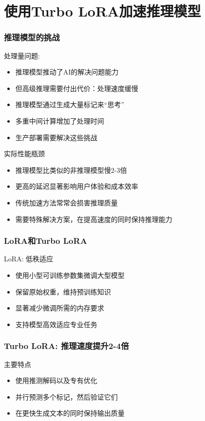 \documentclass[aspectratio=169]{beamer}
\begin{document}
\section{使用Turbo LoRA加速推理模型}

\begin{frame}[shrink=10]
	\frametitle{推理模型的挑战}
	\begin{block}{处理量问题:}
		\begin{itemize}
			\item 推理模型推动了AI的解决问题能力
			\item 但高级推理需要付出代价：处理速度缓慢
			\item 推理模型通过生成大量标记来“思考”
			\item 多重中间计算增加了处理时间
			\item 生产部署需要解决这些挑战
		\end{itemize}
	\end{block}
	\begin{block}{实际性能瓶颈}
		\begin{itemize}
			\item 推理模型比类似的非推理模型慢2-3倍
			\item 更高的延迟显著影响用户体验和成本效率
			\item 传统加速方法常常会损害推理质量
			\item 需要特殊解决方案，在提高速度的同时保持推理能力
		\end{itemize}
	\end{block}
\end{frame}

\begin{frame}[shrink=10]
	\frametitle{LoRA和Turbo LoRA}
	\begin{block}{LoRA: 低秩适应}
		\begin{itemize}
			\item 使用小型可训练参数集微调大型模型
			\item 保留原始权重，维持预训练知识
			\item 显著减少微调所需的内存要求
			\item 支持模型高效适应专业任务
		\end{itemize}
	\end{block}
\end{frame}

\begin{frame}[shrink=15]
	\frametitle{Turbo LoRA: 推理速度提升2-4倍}
	\begin{block}{主要特点}
		\begin{itemize}
			\item 使用推测解码以及专有优化
			\item 并行预测多个标记，然后验证它们
			\item 在更快生成文本的同时保持输出质量
		\end{itemize}
	\end{block}
\end{frame}
\end{document}

